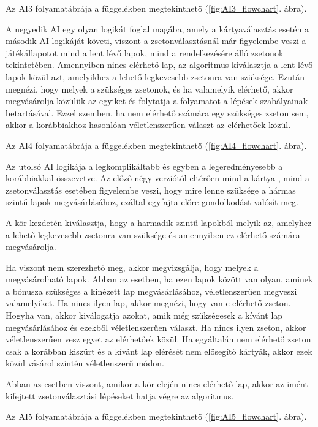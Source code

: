 Az AI3 folyamatábrája a függelékben megtekinthető (\ref{fig:AI3_flowchart}. ábra).



A negyedik AI egy olyan logikát foglal magába, amely a kártyaválasztás esetén a második AI logikáját követi, viszont a zsetonválasztásnál már figyelembe veszi a játékállapotot mind a lent lévő lapok, mind a rendelkezésére álló zsetonok tekintetében. Amennyiben nincs elérhető lap, az algoritmus kiválasztja a lent lévő lapok közül azt, amelyikhez a lehető legkevesebb zsetonra van szüksége. Ezután megnézi, hogy melyek a szükséges zsetonok, és ha valamelyik elérhető, akkor megvásárolja közülük az egyiket és folytatja a folyamatot a lépések szabályainak betartásával. Ezzel szemben, ha nem elérhető számára egy szükséges zseton sem, akkor a korábbiakhoz hasonlóan véletlenszerűen választ az elérhetőek közül.

Az AI4 folyamatábrája a függelékben megtekinthető (\ref{fig:AI4_flowchart}. ábra).


Az utolsó AI logikája a legkomplikáltabb és egyben a legeredményesebb a korábbiakkal összevetve. Az előző négy verziótól eltérően mind a kártya-, mind a zsetonválasztás esetében figyelembe veszi, hogy mire lenne szüksége a hármas szintű lapok megvásárlásához, ezáltal egyfajta előre gondolkodást valósít meg.

A kör kezdetén kiválasztja, hogy a harmadik szintű lapokból melyik az, amelyhez a lehető legkevesebb zsetonra van szüksége és amennyiben ez elérhető számára megvásárolja.

Ha viszont nem szerezhető meg, akkor megvizsgálja, hogy melyek a megvásárolható lapok. Abban az esetben, ha ezen lapok között van olyan, aminek a bónusza szükséges a kinézett lap megvásárlásához, véletlenszerűen megveszi valamelyiket. Ha nincs ilyen lap, akkor megnézi, hogy van-e elérhető zseton. Hogyha van, akkor kiválogatja azokat, amik még szükségesek a kívánt lap megvásárlásához és ezekből véletlenszerűen választ. Ha nincs ilyen zseton, akkor véletlenszerűen vesz egyet az elérhetőek közül. Ha egyáltalán nem elérhető zseton csak a korábban kiszűrt és a kívánt lap elérését nem elősegítő kártyák, akkor ezek közül vásárol szintén véletlenszerű módon.


Abban az esetben viszont, amikor a kör elején nincs elérhető lap, akkor az imént kifejtett zsetonválasztási lépéseket hatja végre az algoritmus.

Az AI5 folyamatábrája a függelékben megtekinthető (\ref{fig:AI5_flowchart}. ábra).

